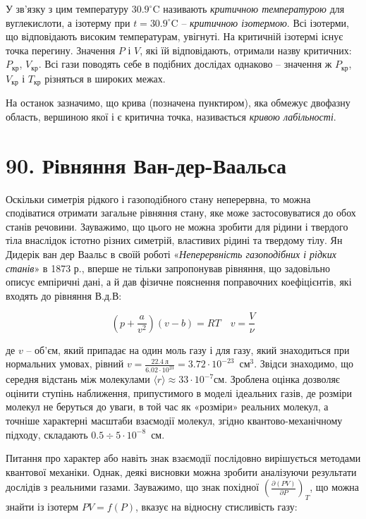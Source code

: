 \documentclass{article}
\begin{document}
У зв'язку з цим температуру $30.9^\circ\mathrm{C}$ називають \emph{критичною температурою} для
вуглекислоти, а ізотерму при $t = 30.9^\circ\mathrm{C}$ -- \emph{критичною ізотермою}. Всі ізотерми,
що відповідають високим температурам, увігнуті. На критичній ізотермі існує точка перегину. Значення
$P$ і $V$, які їй відповідають, отримали назву критичних: $P_{\text{кр}}$, $V_{\text{кр}}$. Всі гази
поводять себе в подібних дослідах однаково -- значення ж $P_{\text{кр}}$, $V_{\text{кр}}$ і
$T_{\text{кр}}$ різняться в широких межах.

На останок зазначимо, що крива (позначена пунктиром), яка обмежує двофазну область, вершиною якої і є
критична точка, називається \emph{кривою лабільності}.

\section*{90. Рівняння Ван-дер-Ваальса}

Оскільки симетрія рідкого і газоподібного стану неперервна, то можна сподіватися отримати загальне
рівняння стану, яке може застосовуватися до обох станів речовини. Зауважимо, що цього не можна зробити
для рідини і твердого тіла внаслідок істотно різних симетрій, властивих рідині та твердому тілу. Ян
Дидерік ван дер Ваальс в своїй роботі «\emph{Неперервність газоподібних і рідких станів}» в 1873 р.,
вперше не тільки запропонував рівняння, що задовільно описує емпіричні дані, а й дав фізичне пояснення
поправочних коефіцієнтів, які входять до рівняння В.д.В:

\begin{equation}
\left( p + \frac{a}{v^{2}} \right)(v - b) = RT\quad
v = \frac{V}{\nu}
\label{eq:90.1}
\end{equation}

де $v$ -- об'єм, який припадає на один моль газу і для газу, який знаходиться при нормальних умовах,
рівний
$v = \frac{22.4\ \text{л}}{6.02 \cdot 10^{23}} = 3.72 \cdot 10^{-23}$~см$^{3}$.
Звідси знаходимо, що середня відстань між молекулами $\langle r \rangle \approx 33\cdot10^{-7}
\text{см}$. Зроблена оцінка дозволяє оцінити ступінь наближення, припустимого в моделі ідеальних
газів, де
розміри молекул не беруться до уваги, в той час як «розміри» реальних молекул, а точніше характерні
масштаби взаємодії молекул, згідно квантово-механічному підходу, складають $0.5\div5\cdot10^{-8}$~см.

Питання про характер або навіть знак взаємодії послідовно вирішується методами квантової механіки.
Однак, деякі висновки можна зробити аналізуючи результати дослідів з реальними газами. Зауважимо, що
знак похідної $\left(\frac{\partial(PV)}{\partial P}\right)_T$, що можна знайти із ізотерм $PV =
f(P)$, вказує на відносну стисливість газу:
\end{document}
